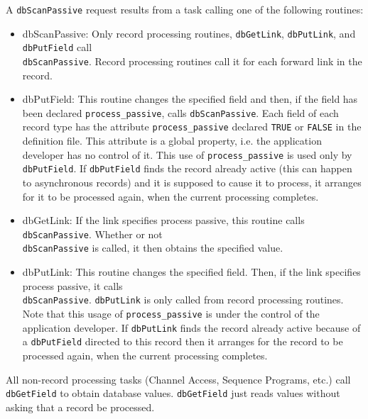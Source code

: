 A \verb|dbScanPassive| request results from a task calling one of the following routines:

\begin{itemize}
\item {}dbScanPassive:  Only record processing routines, \verb|dbGetLink|, \verb|dbPutLink|, and \verb|dbPutField| call \\
\verb|dbScanPassive|. Record processing routines call it for each forward link in the record. 

\item {}dbPutField:  This routine changes the specified field and then, if the field has been declared \verb|process_passive|, 
calls \verb|dbScanPassive|. Each field of each record type has the attribute \verb|process_passive| declared \verb|TRUE| or 
\verb|FALSE| in the definition file. This attribute is a global property, i.e. the application developer has no control of it. 
This use of \verb|process_passive| is used only by \verb|dbPutField|. If \verb|dbPutField| finds the record already active 
(this can happen to asynchronous records) and it is supposed to cause it to process, it arranges for it to be processed 
again, when the current processing completes.

\item {}dbGetLink:  If the link specifies process passive, this routine calls \verb|dbScanPassive|. Whether or not \\
\verb|dbScanPassive| is called, it then obtains the specified value. 

\item {}dbPutLink:  This routine changes the specified field. Then, if the link specifies process passive, it calls \\
\verb|dbScanPassive|. \verb|dbPutLink| is only called from record processing routines. Note that this usage of 
\verb|process_passive| is under the control of the application developer. If \verb|dbPutLink| finds the record already 
active because of a \verb|dbPutField| directed to this record then it arranges for the record to be processed again,  
when the current processing completes.

\end{itemize}

All non-record processing tasks (Channel Access, Sequence Programs, etc.) call \verb|dbGetField| to obtain database values. 
\verb|dbGetField| just reads values without asking that a record be processed.

